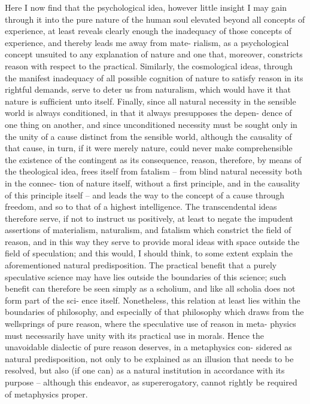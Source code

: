 Here I now ﬁnd that the psychological idea, however little insight I may
gain through it into the pure nature of the human soul elevated beyond
all concepts of experience, at least reveals clearly enough the inadequacy
of those concepts of experience, and thereby leads me away from mate-
rialism, as a psychological concept unsuited to any explanation of nature
and one that, moreover, constricts reason with respect to the practical.
Similarly, the cosmological ideas, through the manifest inadequacy of all
possible cognition of nature to satisfy reason in its rightful demands,
serve to deter us from naturalism, which would have it that nature is
sufﬁcient unto itself. Finally, since all natural necessity in the sensible
world is always conditioned, in that it always presupposes the depen-
dence of one thing on another, and since unconditioned necessity must
be sought only in the unity of a cause distinct from the sensible world,
although the causality of that cause, in turn, if it were merely nature,
could never make comprehensible the existence of the contingent as its
consequence, reason, therefore, by means of the theological idea, frees
itself from fatalism – from blind natural necessity both in the connec-
tion of nature itself, without a ﬁrst principle, and in the causality of this
principle itself – and leads the way to the concept of a cause through
freedom, and so to that of a highest intelligence. The transcendental
ideas therefore serve, if not to instruct us positively, at least to negate
the impudent assertions of materialism, naturalism, and fatalism which
constrict the ﬁeld of reason, and in this way they serve to provide moral
ideas with space outside the ﬁeld of speculation; and this would, I should
think, to some extent explain the aforementioned natural predisposition.
The practical beneﬁt that a purely speculative science may have lies
outside the boundaries of this science; such beneﬁt can therefore be seen
simply as a scholium, and like all scholia does not form part of the sci-
ence itself. Nonetheless, this relation at least lies within the boundaries
of philosophy, and especially of that philosophy which draws from the
wellsprings of pure reason, where the speculative use of reason in meta-
physics must necessarily have unity with its practical use in morals. Hence
the unavoidable dialectic of pure reason deserves, in a metaphysics con-
sidered as natural predisposition, not only to be explained as an illusion
that needs to be resolved, but also (if one can) as a natural institution in
accordance with its purpose – although this endeavor, as supererogatory,
cannot rightly be required of metaphysics proper.

